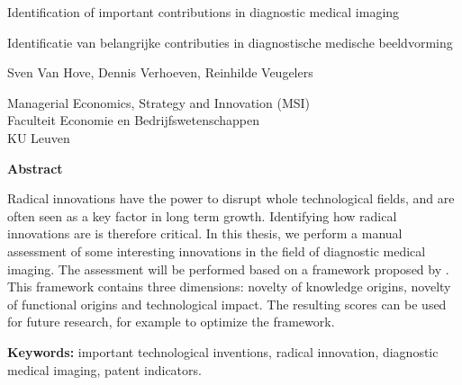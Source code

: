 
\cleardoublepage
\thispagestyle{plain}
\begin{center}
    \Huge 
    Identification of important contributions in diagnostic medical imaging
    
    \vspace{0.5cm}
    
    \large
    Identificatie van belangrijke contributies in diagnostische medische beeldvorming
    
    \vspace{1.0cm}
    
    Sven Van Hove, Dennis Verhoeven, Reinhilde Veugelers
    
    \vspace{0.5cm}
    
	Managerial Economics, Strategy and Innovation (MSI)\\
	Faculteit Economie en Bedrijfswetenschappen\\
	KU Leuven
    
    \vspace{1.0cm}
    \textbf{Abstract}
\end{center}

Radical innovations have the power to disrupt whole technological fields, and
are often seen as a key factor in long term growth. Identifying how radical
innovations are is therefore critical. In this thesis, we perform a manual
assessment of some interesting innovations in the field of diagnostic medical
imaging. The assessment will be performed based on a framework proposed by
\cite{verhoeven}. This framework contains three dimensions: novelty of knowledge
origins, novelty of functional origins and technological impact. The resulting
scores can be used for future research, for example to optimize the framework.

\vspace{1.0cm}

\textbf{Keywords:} important technological inventions,
radical innovation, diagnostic medical imaging, patent indicators. 
